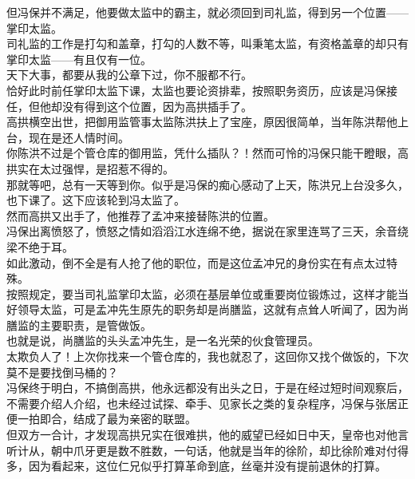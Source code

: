 \begin{multicols}{\theparacolNo}
但冯保并不满足，他要做太监中的霸主，就必须回到司礼监，得到另一个位置——掌印太监。\\

司礼监的工作是打勾和盖章，打勾的人数不等，叫秉笔太监，有资格盖章的却只有掌印太监——有且仅有一位。\\

天下大事，都要从我的公章下过，你不服都不行。\\

恰好此时前任掌印太监下课，太监也要论资排辈，按照职务资历，应该是冯保接任，但他却没有得到这个位置，因为高拱插手了。\\

高拱横空出世，把御用监管事太监陈洪扶上了宝座，原因很简单，当年陈洪帮他上台，现在是还人情时间。\\

你陈洪不过是个管仓库的御用监，凭什么插队？！然而可怜的冯保只能干瞪眼，高拱实在太过强悍，是招惹不得的。\\

那就等吧，总有一天等到你。似乎是冯保的痴心感动了上天，陈洪兄上台没多久，也下课了。这下应该轮到冯太监了。\\

然而高拱又出手了，他推荐了孟冲来接替陈洪的位置。\\

冯保出离愤怒了，愤怒之情如滔滔江水连绵不绝，据说在家里连骂了三天，余音绕梁不绝于耳。\\

如此激动，倒不全是有人抢了他的职位，而是这位孟冲兄的身份实在有点太过特殊。\\

按照规定，要当司礼监掌印太监，必须在基层单位或重要岗位锻炼过，这样才能当好领导太监，可是孟冲先生原先的职务却是尚膳监，这就有点耸人听闻了，因为尚膳监的主要职责，是管做饭。\\

也就是说，尚膳监的头头孟冲先生，是一名光荣的伙食管理员。\\

太欺负人了！上次你找来一个管仓库的，我也就忍了，这回你又找个做饭的，下次莫不是要找倒马桶的？\\

冯保终于明白，不搞倒高拱，他永远都没有出头之日，于是在经过短时间观察后，不需要介绍人介绍，也未经过试探、牵手、见家长之类的复杂程序，冯保与张居正便一拍即合，结成了最为亲密的联盟。\\

但双方一合计，才发现高拱兄实在很难拱，他的威望已经如日中天，皇帝也对他言听计从，朝中爪牙更是数不胜数，一句话，他就是当年的徐阶，却比徐阶难对付得多，因为看起来，这位仁兄似乎打算革命到底，丝毫并没有提前退休的打算。\\


\end{multicols}
